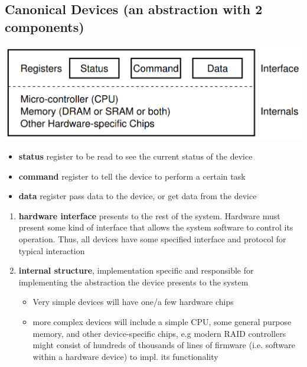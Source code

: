 \documentclass[8pt,a4paper,landscape]{extarticle}
\begin{document}
\begin{multicols*}{3}
\section*{Canonical Devices (an abstraction with 2 components)}
\includegraphics[width=\linewidth]{imgs/canonical_dev}
\begin{itemize}
\item \textbf{status} register to be read to see the current status of the device
\item \textbf{command} register to tell the device to perform a certain task
\item \textbf{data} register pass data to the device, or get data from
the device
\end{itemize}
\begin{enumerate}
\item \textbf{hardware interface} presents to the rest of the system. Hardware must present some kind of interface that allows the system
software to control its operation. Thus, all devices have some specified
interface and protocol for typical interaction
\item \textbf{internal structure}, implementation specific and responsible for implementing the abstraction the device presents to the system
  \begin{itemize}
  \item Very simple devices will have one/a few hardware chips
  \item more complex devices will include a simple CPU, some general purpose
memory, and other device-specific chips, e.g modern RAID controllers might consist of hundreds of thousands of lines of firmware (i.e. software within a hardware device)  to impl. its functionality
  \end{itemize}
\end{enumerate}

\end{multicols*}
\end{document}
